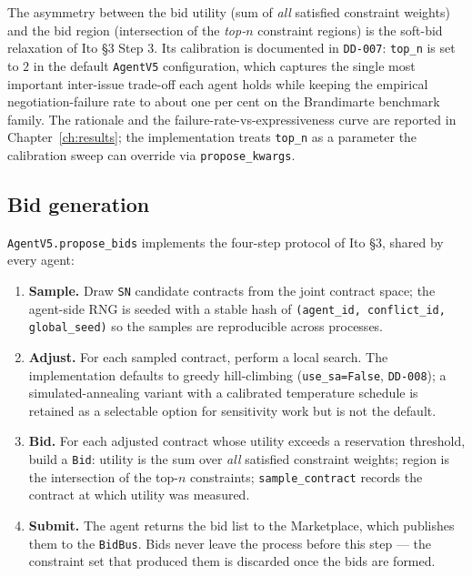 The asymmetry between the bid utility (sum of \emph{all} satisfied
constraint weights) and the bid region (intersection of the
\emph{top-$n$} constraint regions) is the soft-bid relaxation of Ito
\cite{ito2007multiissue} §3 Step 3. Its calibration is documented in
\texttt{DD-007}: \texttt{top\_n} is set to $2$ in the default
\texttt{AgentV5} configuration, which captures the single most important
inter-issue trade-off each agent holds while keeping the empirical
negotiation-failure rate to about one per cent on the Brandimarte
benchmark family. The rationale and the failure-rate-vs-expressiveness
curve are reported in Chapter~\ref{ch:results}; the implementation
treats \texttt{top\_n} as a parameter the calibration sweep can override
via \texttt{propose\_kwargs}.

\subsection{Bid generation}

\texttt{AgentV5.propose\_bids} implements the four-step protocol of Ito
\cite{ito2007multiissue} §3, shared by every agent:

\begin{enumerate}[leftmargin=1.8em,itemsep=0.2em]
  \item \textbf{Sample.} Draw \texttt{SN} candidate contracts from the
    joint contract space; the agent-side RNG is seeded with a stable
    hash of \texttt{(agent\_id, conflict\_id, global\_seed)} so the
    samples are reproducible across processes.
  \item \textbf{Adjust.} For each sampled contract, perform a local
    search. The implementation defaults to greedy hill-climbing
    (\texttt{use\_sa=False}, \texttt{DD-008}); a simulated-annealing
    variant with a calibrated temperature schedule is retained as a
    selectable option for sensitivity work but is not the default.
  \item \textbf{Bid.} For each adjusted contract whose utility exceeds
    a reservation threshold, build a \texttt{Bid}: utility is the sum
    over \emph{all} satisfied constraint weights; region is the
    intersection of the top-$n$ constraints; \texttt{sample\_contract}
    records the contract at which utility was measured.
  \item \textbf{Submit.} The agent returns the bid list to the
    Marketplace, which publishes them to the \texttt{BidBus}. Bids
    never leave the process before this step --- the constraint set
    that produced them is discarded once the bids are formed.
\end{enumerate}

